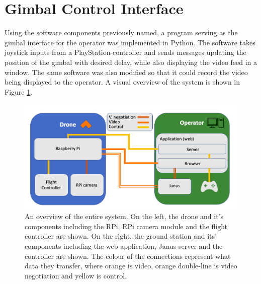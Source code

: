 \documentclass[nofilelist]{cslthse-msc}
\begin{document}
\section{Gimbal Control Interface}
Using the software components previously named, a program serving as the gimbal interface for the operator was implemented in Python. The software takes joystick inputs from a PlayStation-controller and sends messages updating the position of the gimbal with desired delay, while also displaying the video feed in a window. The same software was also modified so that it could record the video being displayed to the operator. A visual overview of the system is shown in Figure \ref{fig:system-overview}.
\begin{figure}[!hbt]
   \centering
   \includegraphics[scale=0.5]{images/system-overview.png} 
   \caption{An overview of the entire system. On the left, the drone and it's components including the RPi, RPi camera module and the flight controller are shown. On the right, the ground station and its' components including the web application, Janus server and the controller are shown. The colour of the connections represent what data they transfer, where orange is video, orange double-line is video negotiation and yellow is control.}
   \label{fig:system-overview}
\end{figure}
\end{document}
